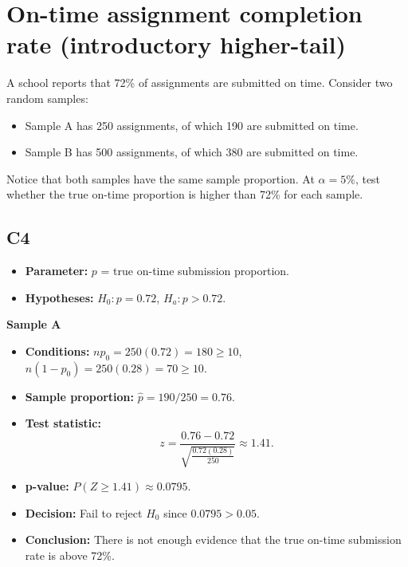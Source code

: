 \begin{center}
	\hspace{0.8cm}
	\hspace{0.8cm}
\end{center}
		
		
\section{On-time assignment completion rate (introductory higher-tail)}
		A school reports that 72\% of assignments are submitted on time. Consider two random samples:
		\begin{itemize}
		\item Sample A has 250 assignments, of which 190 are submitted on time.
		\item Sample B has 500 assignments, of which 380 are submitted on time.
		\end{itemize}
		Notice that both samples have the same sample proportion. At \(\alpha=5\%\), test whether the true on-time proportion is higher than 72\% for each sample.
		
	\subsection*{C4}
	\begin{itemize}
	\item \textbf{Parameter:} \(p\) = true on-time submission proportion.
		\item \textbf{Hypotheses:} \(H_0\colon p=0.72\), \(H_a\colon p>0.72\).
	\end{itemize}
	
	\textbf{Sample A}
	
	\begin{itemize}
	\item \textbf{Conditions:} \(np_0=250(0.72)=180\ge10\), \(n(1-p_0)=250(0.28)=70\ge10\).
	\item \textbf{Sample proportion:} \(\hat p=190/250=0.76\).
		\item \textbf{Test statistic:}
		\[
		z=\frac{0.76-0.72}{\sqrt{\frac{0.72(0.28)}{250}}}\approx 1.41.
		\]
		\item \textbf{p-value:} \(P(Z\ge 1.41)\approx 0.0795\).
		\item \textbf{Decision:} Fail to reject \(H_0\) since \(0.0795>0.05\).
		\item \textbf{Conclusion:} There is not enough evidence that the true on-time submission rate is above 72\%.
		\end{itemize}
		
